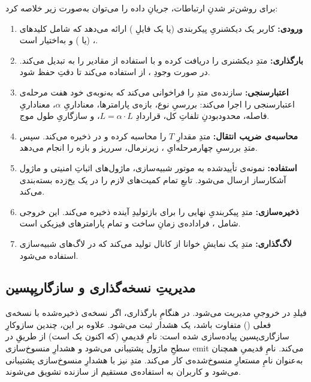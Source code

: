 برای روشن‌تر شدنِ ارتباطات، جریانِ داده را می‌توان به‌صورت زیر خلاصه کرد:

\begin{enumerate}
	\item \textbf{ورودی:} کاربر یک دیکشنریِ پیکربندی (یا یک فایلِ ) ارائه می‌دهد که شامل کلیدهای ،  (یا ) و به‌اختیار  است.
	\item \textbf{بارگذاری:} متدِ  دیکشنری را دریافت کرده و با استفاده از  مقادیر را به  تبدیل می‌کند. در صورت وجودِ ، از  استفاده می‌کند تا دقتِ  حفظ شود.
	\item \textbf{اعتبارسنجی:} سازنده‌ی  متدِ  را فراخوانی می‌کند که به‌نوبه‌ی خود هفت مرحله‌ی اعتبارسنجی را اجرا می‌کند: بررسیِ نوع، بازه‌ی پارامترها، معناداریِ $\alpha$، معناداریِ فاصله، محدودبودنِ تلفاتِ کل، قراردادِ $L = \alpha \cdot L$، و سازگاریِ طول موج.
	\item \textbf{محاسبه‌ی ضریب انتقال:} متدِ  مقدارِ $T$ را محاسبه کرده و در  ذخیره می‌کند. سپس متدِ  بررسیِ چهارمرحله‌ایِ ، زیرنرمال، سرریز و بازه را انجام می‌دهد.
	\item \textbf{استفاده:} نمونه‌ی تأییدشده به موتور شبیه‌سازی، ماژول‌های اثباتِ امنیتی و ماژول آشکارساز ارسال می‌شود. تابعِ  تمام کمیت‌های لازم را در یک  یخ‌زده بسته‌بندی می‌کند.
	\item \textbf{ذخیره‌سازی:} متدِ  پیکربندیِ نهایی را برای بازتولیدِ آینده ذخیره می‌کند. این خروجی شامل ، فراداده‌ی زمانِ ساخت و تمام پارامترهای فیزیکی است.
	\item \textbf{لاگ‌گذاری:} متدِ  یک نمایشِ خوانا از کانال تولید می‌کند که در لاگ‌های شبیه‌سازی استفاده می‌شود.
\end{enumerate}

\subsection{مدیریتِ نسخه‌گذاری و سازگاریِپسین}

فیلدِ  در خروجیِ  مدیریت می‌شود. در هنگامِ بارگذاری، اگر نسخه‌ی ذخیره‌شده با نسخه‌ی فعلی () متفاوت باشد، یک هشدار ثبت می‌شود. علاوه بر این، چندین سازوکارِ سازگاری‌پسین پیاده‌سازی شده است: نامِ قدیمیِ  (که اکنون یک  است) از طریقِ  در سطحِ ماژول  پشتیبانی می‌شود و هشدارِ منسوخ‌سازی emit می‌کند. نامِ قدیمیِ  همچنان به‌عنوان نامِ مستعارِ منسوخ‌شده‌ی  کار می‌کند. متدِ  نیز با هشدارِ منسوخ‌سازی پشتیبانی می‌شود و کاربران به استفاده‌ی مستقیم از سازنده تشویق می‌شوند.

